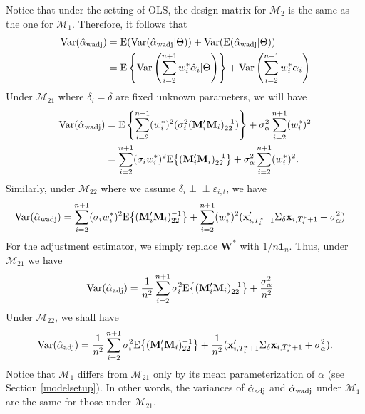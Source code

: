 \documentclass[11pt,3p,review,authoryear]{elsarticle}
\def\mbf#1{\mathbf{#1}} %
\newcommand{\indep}{\perp \!\!\! \perp } %
\def\mrm#1{\mathrm{#1}} %
\def\mc#1{\mathcal{#1}} %
\def\E#1{\mathrm{E}(#1)} %
\def\var#1{\mathrm{Var}(#1)} %
\theoremstyle{definition}
\begin{document}
Notice that under the setting of OLS, the design matrix for $\mc{M}_2$ is the same as the one for $\mc{M}_1$. Therefore, it follows that
  \begin{align*}
  \var{\hat{\alpha}_{\rm wadj}} 
  &= \E{\var{\hat{\alpha}_{\rm wadj}|\Theta}} + \var{\E{\hat{\alpha}_{\rm wadj}|\Theta}} \\
  &=\mrm{E} \left\{\mrm{Var}\left(\sum_{i=2}^{n+1} w_i^*\hat{\alpha}_i|\Theta\right)\right\} +\mrm{Var}\left(\sum_{i=2}^{n+1} w_i^*\alpha_i\right) 
\end{align*}
Under $\mc{M}_{21}$ where $\delta_i=\delta$ are fixed unknown parameters,  we will have
  \begin{align}
  \var{\hat{\alpha}_{\rm wadj}} 
  &= \mrm{E} \left\{\sum_{i=2}^{n+1}(w_i^*)^2(\sigma_i^2(\mbf{M}'_i\mbf{M}_i)^{-1}_{22})\right\} +\sigma^2_{\alpha}\sum_{i=2}^{n+1}(w_i^*)^2  \nonumber\\
  &= \sum_{i=2}^{n+1}(\sigma_i w_i^*)^2\mrm{E}\big\{(\mbf{M}'_i\mbf{M}_i)^{-1}_{22}\big\}+\sigma^2_{\alpha}\sum_{i=2}^{n+1}(w_i^*)^2.\label{equation6}
\end{align}
Similarly, under $\mc{M}_{22}$ where we assume $\delta_i \indep \varepsilon_{i,t}$, we have
 \begin{align*}
  \var{\hat{\alpha}_{\rm wadj}} 
  &= \sum_{i=2}^{n+1}(\sigma_i w_i^*)^2\mrm{E}\big\{(\mbf{M}'_i\mbf{M}_i)^{-1}_{22}\big\} + \sum_{i=2}^{n+1} (w_i^*)^2 (\mbf{x}_{i, T_i^*+1}'\Sigma_{\delta}\mbf{x}_{i, T_i^*+1} + \sigma^2_{\alpha})
\end{align*}
For the adjustment estimator, we simply replace $\mbf{W}^*$ with $1/n\mbf{1}_n$. Thus, under $\mc{M}_{21}$ we have 
 \begin{align*}
  \var{\hat{\alpha}_{\rm adj}} 
  &=\frac{1}{n^2}\sum_{i=2}^{n+1} \sigma_i^2\mrm{E}\big\{(\mbf{M}'_i\mbf{M}_i)^{-1}_{22}\big\}+\frac{\sigma^2_{\alpha}}{n^2}
\end{align*}
Under $\mc{M}_{22}$, we shall have
 \begin{align*}
  \var{\hat{\alpha}_{\rm adj}} 
  =\frac{1}{n^2}\sum_{i=2}^{n+1}\sigma_i^2\mrm{E}\big\{(\mbf{M}'_i\mbf{M}_i)^{-1}_{22}\big\}
   +\frac{1}{n^2}(\mbf{x}_{i, T_i^*+1}'\Sigma_{\delta}\mbf{x}_{i, T_i^*+1} + \sigma^2_{\alpha}).
\end{align*}
Notice that $\mc{M}_{1}$ differs from $\mc{M}_{21}$ only by its mean parameterization of $\alpha$ (see Section \ref{modelsetup}). In other words, the variances of $\hat{\alpha}_{\rm adj}$ and $\hat{\alpha}_{\rm wadj}$ under $\mc{M}_1$ are the same for those under $\mc{M}_{21}$.
\end{document}
